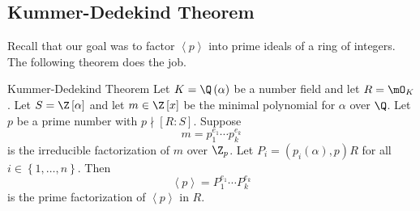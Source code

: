 \documentclass[pmath441]{subfiles}
\begin{document}
    \subsection{Kummer-Dedekind Theorem}

    Recall that our goal was to factor $\left< p \right>$ into prime ideals of a ring of integers. The following theorem does the job.

    \begin{theorem}{Kummer-Dedekind Theorem}
        Let $K = \Q\left( \alpha \right)$ be a number field and let $R=\mO_K$. Let $S=\Z\left[ \alpha \right]$ and let $m\in\Z\left[ x \right]$ be the minimal polynomial for $\alpha$ over $\Q$. Let $p$ be a prime number with $p\nmid\left[ R:S \right]$. Suppose
        \begin{equation*}
            m = p_1^{e_1}\cdots p_k^{e_k}
        \end{equation*}
        is the irreducible factorization of $m$ over $\Z_p$. Let $P_i = \left( p_i\left( \alpha \right),p \right)R$ for all $i\in\left\lbrace 1,\ldots,n \right\rbrace$. Then
        \begin{equation*}
            \left< p \right> = P_1^{e_1}\cdots P_k^{e_k} 
        \end{equation*}
        is the prime factorization of $\left< p \right> $ in $R$.
    \end{theorem}
\end{document}
